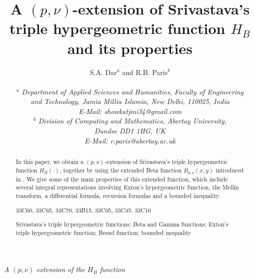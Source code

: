 %
%
%
\oddsidemargin 0.5cm
\evensidemargin 0.5cm
\topmargin=-0.5in
\textwidth 15.3cm
\textheight 22cm
\title{\bf A $(p,\nu)$-extension of Srivastava's triple hypergeometric function $H_B$ and its properties}
\author{\sc S.A. Dar$^a$ and R.B. Paris$^b$\\
\\
${}^a\!$ {\em Department of Applied Sciences and Humanities, Faculty of Engineering }\\
{\em and Technology, Jamia Millia Islamia, New Delhi, 110025, India}\\ 
{\em E-Mail: showkatjmi34@gmail.com}\\
${}^b\!$ {\em Division of Computing and Mathematics, Abertay University,}\\
{\em Dundee DD1 1HG, UK}\\
{\em E-Mail: r.paris@abertay.ac.uk}
}

%
\newcommand{\bee}{\begin{equation}}
\newcommand{\ee}{\end{equation}}
\newcommand{\br}{\biggr}
\newcommand{\bl}{\biggl}
\newcommand{\g}{\Gamma}
\def\f#1#2{\mbox{${\textstyle \frac{#1}{#2}}$}}
\def\dfrac#1#2{\displaystyle{\frac{#1}{#2}}}
\newcommand{\fr}{\frac{1}{2}}
\newcommand{\fs}{\f{1}{2}}
\date{}
\maketitle
\pagestyle{myheadings}
{\hfill \it A $(p,\nu)$ extension of the $H_B$ function \hfill}
\begin{abstract}
In this paper, we obtain a $(p,\nu)$-extension of Srivastava's triple hypergeometric function $H_B(\cdot)$,
together by using the extended Beta function $B_{p,\nu}(x,y)$ introduced in \cite{AB30}.  We give some of the main properties of this extended function, which include several integral representations involving Exton's hypergeometric function, the Mellin transform, a differential formula, recursion formulas and a bounded inequality. 
\vspace{0.4cm}

 33C60, 33C65, 33C70, 33B15, 33C05, 33C45, 33C10
\vspace{0.3cm}

 Srivastava's triple hypergeometric functions; Beta and Gamma functions; Exton's triple hypergeometric function; Bessel function; bounded inequality %
\end{abstract}

